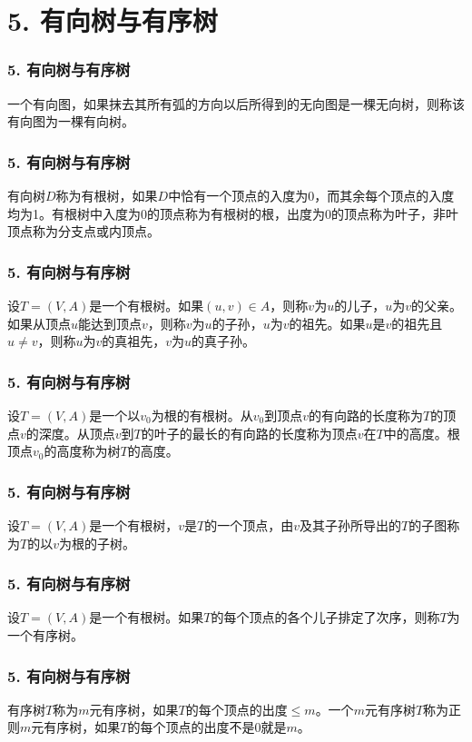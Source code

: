 \section{5. 有向树与有序树}
\begin{frame}
  \frametitle{5. 有向树与有序树}
  \begin{Def}
    一个有向图，如果抹去其所有弧的方向以后所得到的无向图是一棵无向树，则称该有向图为一棵\alert{有向树}。
  \end{Def}
\end{frame}
\begin{frame}
  \frametitle{5. 有向树与有序树}
  \begin{Def}
    有向树$D$称为\alert{有根树}，如果$D$中恰有一个顶点的入度为0，而其余每个顶点的入度均为1。有根树中入度为0的顶点称为有根树的根，出度为0的顶点称为\alert{叶子}，非叶顶点称为\alert{分支点}或\alert{内顶点}。
  \end{Def}
\end{frame}

\begin{frame}
  \frametitle{5. 有向树与有序树}
  \begin{Def}
  设$T=(V,A)$是一个有根树。如果$(u,v)\in A$，则称$v$为$u$的\alert{儿子}，$u$为$v$的\alert{父亲}。如果从顶点$u$能达到顶点$v$，则称$v$为$u$的\alert{子孙}，$u$为$v$的\alert{祖先}。如果$u$是$v$的祖先且$u \neq v$，则称$u$为$v$的\alert{真祖先}，$v$为$u$的\alert{真子孙}。
  \end{Def}
\end{frame}

\begin{frame}
  \frametitle{5. 有向树与有序树}
  \begin{Def}
    设$T=(V,A)$是一个以$v_0$为根的有根树。从$v_0$到顶点$v$的有向路的长度称为$T$的顶点$v$的\alert{深度}。从顶点$v$到$T$的叶子的最长的有向路的长度称为顶点$v$在$T$中的\alert{高度}。根顶点$v_0$的高度称为树$T$的\alert{高度}。
  \end{Def}
\end{frame}

\begin{frame}
  \frametitle{5. 有向树与有序树}
  \begin{Def}
    设$T=(V,A)$是一个有根树，$v$是$T$的一个顶点，由$v$及其子孙所导出的$T$的子图称为$T$的以$v$为根的\alert{子树}。
  \end{Def}
\end{frame}

\begin{frame}
  \frametitle{5. 有向树与有序树}
  \begin{Def}
    设$T=(V,A)$是一个有根树。如果$T$的每个顶点的各个儿子排定了次序，则称$T$为一个\alert{有序树}。
  \end{Def}
\end{frame}

\begin{frame}
  \frametitle{5. 有向树与有序树}
  \begin{Def}
    有序树$T$称为\alert{$m$元有序树}，如果$T$的每个顶点的出度$\leq m$。一个$m$元有序树$T$称为\alert{正则$m$元有序树}，如果$T$的每个顶点的出度不是$0$就是$m$。
  \end{Def}
\end{frame}

